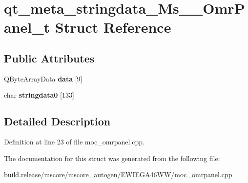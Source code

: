 \hypertarget{structqt__meta__stringdata___ms_____omr_panel__t}{}\section{qt\+\_\+meta\+\_\+stringdata\+\_\+\+Ms\+\_\+\+\_\+\+Omr\+Panel\+\_\+t Struct Reference}
\label{structqt__meta__stringdata___ms_____omr_panel__t}
\subsection*{Public Attributes}
\begin{DoxyCompactItemize}
\item 
\mbox{\label{structqt__meta__stringdata___ms_____omr_panel__t_ac34c6952960b590934bb73cadacc9622}} 
Q\+Byte\+Array\+Data {\bfseries data} \mbox{[}9\mbox{]}
\item 
\mbox{\label{structqt__meta__stringdata___ms_____omr_panel__t_acdc7662d1b26155c94443589abe0c838}} 
char {\bfseries stringdata0} \mbox{[}133\mbox{]}
\end{DoxyCompactItemize}


\subsection{Detailed Description}


Definition at line 23 of file moc\+\_\+omrpanel.\+cpp.



The documentation for this struct was generated from the following file\+:\begin{DoxyCompactItemize}
\item 
build.\+release/mscore/mscore\+\_\+autogen/\+E\+W\+I\+E\+G\+A46\+W\+W/moc\+\_\+omrpanel.\+cpp\end{DoxyCompactItemize}
